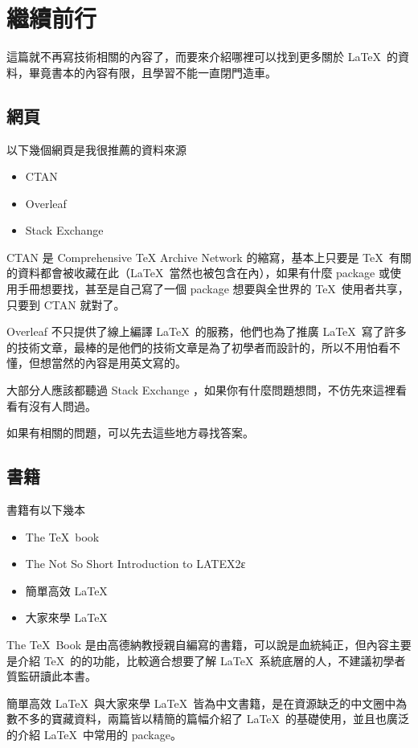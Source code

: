 \chapter{繼續前行}

這篇就不再寫技術相關的內容了，而要來介紹哪裡可以找到更多關於 \LaTeX\ 的資料，畢竟書本的內容有限，且學習不能一直閉門造車。

\section{網頁}

以下幾個網頁是我很推薦的資料來源

\begin{itemize}
\item CTAN
\item Overleaf
\item Stack Exchange
\end{itemize}

CTAN 是 Comprehensive TeX Archive Network 的縮寫，基本上只要是 \TeX\ 有關的資料都會被收藏在此（\LaTeX\ 當然也被包含在內），如果有什麼 package 或使用手冊想要找，甚至是自己寫了一個 package 想要與全世界的 \TeX\ 使用者共享，只要到 CTAN 就對了。

Overleaf 不只提供了線上編譯 \LaTeX\ 的服務，他們也為了推廣 \LaTeX\ 寫了許多的技術文章，最棒的是他們的技術文章是為了初學者而設計的，所以不用怕看不懂，但想當然的內容是用英文寫的。

大部分人應該都聽過 Stack Exchange ，如果你有什麼問題想問，不仿先來這裡看看有沒有人問過。

如果有相關的問題，可以先去這些地方尋找答案。

\section{書籍}

書籍有以下幾本

\begin{itemize}
\item The \TeX\ book
\item The Not So Short Introduction to LATEX2ε
\item 簡單高效 \LaTeX
\item 大家來學 \LaTeX
\end{itemize}

The \TeX\ Book 是由高德納教授親自編寫的書籍，可以說是血統純正，但內容主要是介紹 \TeX\ 的的功能，比較適合想要了解 \LaTeX\ 系統底層的人，不建議初學者質監研讀此本書。

簡單高效 \LaTeX\ 與大家來學 \LaTeX\ 皆為中文書籍，是在資源缺乏的中文圈中為數不多的寶藏資料，兩篇皆以精簡的篇幅介紹了 \LaTeX\ 的基礎使用，並且也廣泛的介紹 \LaTeX\ 中常用的 package。 

